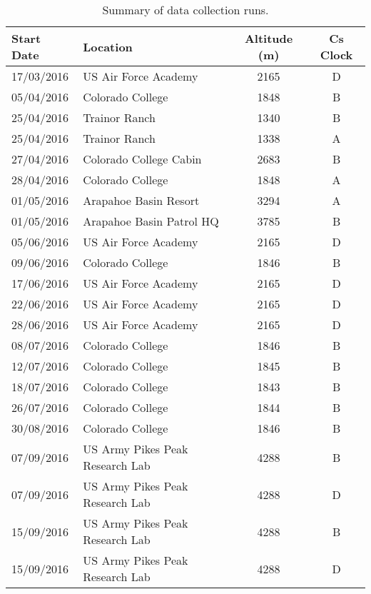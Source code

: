\documentclass[prb,preprint]{revtex4-1}
\begin{document}
\begin{table}[ht!]
\centering
\caption{Summary of data collection runs.}
\begin{ruledtabular}
\begin{tabular}{l l c c}
Start Date  & Location & Altitude (m) & Cs Clock \\
\hline	%
17/03/2016 & US Air Force Academy& 2165 & D \\
05/04/2016 & Colorado College & 1848 & B \\
25/04/2016 & Trainor Ranch & 1340 & B \\
25/04/2016 & Trainor Ranch & 1338 & A \\
27/04/2016 & Colorado College Cabin & 2683 & B \\
28/04/2016 & Colorado College & 1848 & A \\
01/05/2016 & Arapahoe Basin Resort & 3294 & A \\
01/05/2016 & Arapahoe Basin Patrol HQ & 3785 & B \\
05/06/2016 & US Air Force Academy& 2165 & D \\
09/06/2016 & Colorado College & 1846 & B \\
17/06/2016 & US Air Force Academy& 2165 & D \\
22/06/2016 & US Air Force Academy& 2165 & D \\
28/06/2016 & US Air Force Academy& 2165 & D \\
08/07/2016 & Colorado College & 1846 & B \\
12/07/2016 & Colorado College & 1845 & B \\
18/07/2016 & Colorado College & 1843 & B \\
26/07/2016 & Colorado College & 1844 & B \\
30/08/2016 & Colorado College & 1846 & B \\
07/09/2016 & US Army Pikes Peak Research Lab & 4288 & B \\
07/09/2016 & US Army Pikes Peak Research Lab & 4288 & D \\
15/09/2016 & US Army Pikes Peak Research Lab & 4288 & B \\
15/09/2016 & US Army Pikes Peak Research Lab & 4288 & D \\
\end{tabular}
\end{ruledtabular}
\label{tbl:data_runs}
\end{table}
\end{document}
